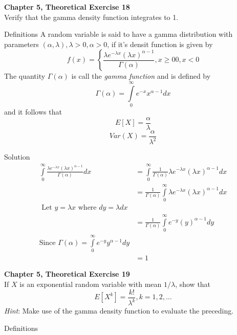 \documentclass{article}
\begin{document}
\begin{spacing}{1.1}
\maketitle

\newpage
\begin{homeworkProblem}
  {\bf Chapter 5, Theoretical Exercise 18}\\
  Verify that the gamma density function integrates to 1.
  
  \begin{homeworkSection}{Definitions}
    A random variable is said to have a gamma distribution with parameters
    $(\alpha, \lambda), \lambda > 0, \alpha > 0$, if it's densit function
    is given by
    \[
      f( x) = \left\{
        \frac{ \lambda e^{-\lambda x} (\lambda x)^{\alpha - 1}}
             { \Gamma( \alpha)} ,x \ge 0
        0 ,x < 0 \right.
    \]
    The quantity $\Gamma( \alpha)$ is call the \emph{gamma function}
    and is defined by
      \[\Gamma( \alpha) = \int\limits_0^\infty e^{-x} x^{\alpha - 1} dx\]
    and it follows that
      \[E[ X] = \frac{ \alpha}{ \lambda}\]
      \[Var(X) = \frac{ \alpha}{ \lambda^2}\]
  \end{homeworkSection}
  \begin{homeworkSection}{Solution}
    \begin{align*}
      \int\limits_0^\infty \frac{ \lambda e^{-\lambda x} (\lambda x)^{\alpha - 1}}
        { \Gamma( \alpha)} dx 
      &= \int\limits_0^\infty \frac{ 1}{ \Gamma( \alpha)}
        \lambda e^{-\lambda x} (\lambda x)^{\alpha - 1} dx\\
      &= \frac{ 1}{ \Gamma( \alpha)} \int\limits_0^\infty
        \lambda e^{-\lambda x} (\lambda x)^{\alpha - 1} dx\\
      \text{ Let $y = \lambda x$ where $dy = \lambda dx$}\\
      &= \frac{ 1}{ \Gamma( \alpha)} \int\limits_0^\infty
        e^{-y} (y)^{\alpha - 1} dy\\
      \text{Since $\Gamma( \alpha) = \int\limits_0^\infty e^{-y} y^{\alpha - 1} dy$}\\
      &= 1
    \end{align*}
  \end{homeworkSection}
\end{homeworkProblem}

\newpage
\begin{homeworkProblem}
  {\bf Chapter 5, Theoretical Exercise 19}\\
  If $X$ is an exponential random variable with mean $1/\lambda$, show that
  \[E[ X^k] = \frac{ k!}{ \lambda^k}, k = 1, 2, \dots\]
  \emph{Hint}: Make use of the gamma density function to evaluate the preceding.
  \begin{homeworkSection}{Definitions}
    

\end{homeworkSection}
\end{homeworkProblem}
\end{spacing}
\end{document}

